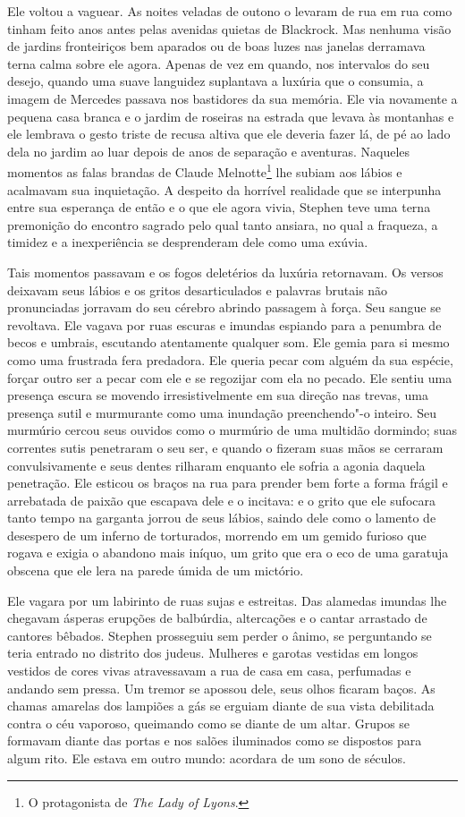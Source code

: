 Ele voltou a vaguear. As noites veladas de outono o levaram de rua em
rua como tinham feito anos antes pelas avenidas quietas de Blackrock.
Mas nenhuma visão de jardins fronteiriços bem aparados ou de boas luzes
nas janelas derramava terna calma sobre ele agora. Apenas de vez em
quando, nos intervalos do seu desejo, quando uma suave languidez
suplantava a luxúria que o consumia, a imagem de Mercedes passava nos
bastidores da sua memória. Ele via novamente a pequena casa branca e o
jardim de roseiras na estrada que levava às montanhas e ele lembrava o
gesto triste de recusa altiva que ele deveria fazer lá, de pé ao lado
dela no jardim ao luar depois de anos de separação e aventuras.
Naqueles momentos as falas brandas de Claude Melnotte\footnote{ O
protagonista de \textit{The Lady of Lyons}.} lhe subiam aos lábios e acalmavam sua inquietação. A
despeito da horrível realidade que se interpunha entre sua esperança de
então e o que ele agora vivia, Stephen teve uma terna premonição do
encontro sagrado pelo qual tanto ansiara, no qual a fraqueza, a timidez
e a inexperiência se desprenderam dele como uma exúvia.

Tais momentos passavam e os fogos deletérios da luxúria retornavam. Os
versos deixavam seus lábios e os gritos desarticulados e palavras
brutais não pronunciadas jorravam do seu cérebro abrindo passagem à
força. Seu sangue se revoltava. Ele vagava por ruas escuras e imundas
espiando para a penumbra de becos e umbrais, escutando atentamente
qualquer som. Ele gemia para si mesmo como uma frustrada fera
predadora. Ele queria pecar com alguém da sua espécie, forçar outro ser
a pecar com ele e se regozijar com ela no pecado. Ele sentiu uma
presença escura se movendo irresistivelmente em sua direção nas trevas,
uma presença sutil e murmurante como uma inundação preenchendo"-o
inteiro. Seu murmúrio cercou seus ouvidos como o murmúrio de uma
multidão dormindo; suas correntes sutis penetraram o seu ser, e quando
o fizeram suas mãos se cerraram convulsivamente e seus dentes rilharam
enquanto ele sofria a agonia daquela penetração. Ele esticou os braços
na rua para prender bem forte a forma frágil e arrebatada de paixão
que escapava dele e o incitava: e o grito que ele sufocara tanto tempo
na garganta jorrou de seus lábios, saindo dele como o lamento de
desespero de um inferno de torturados, morrendo em um gemido furioso
que rogava e exigia o abandono mais iníquo, um grito que era o eco de
uma garatuja obscena que ele lera na parede úmida de um mictório.

Ele vagara por um labirinto de ruas sujas e estreitas. Das alamedas
imundas lhe chegavam ásperas erupções de balbúrdia, altercações e o
cantar arrastado de cantores bêbados. Stephen prosseguiu sem perder o
ânimo, se perguntando se teria entrado no distrito dos judeus. Mulheres
e garotas vestidas em longos vestidos de cores vivas atravessavam a rua
de casa em casa, perfumadas e andando sem pressa. Um tremor se apossou
dele, seus olhos ficaram baços. As chamas amarelas dos lampiões a gás
se erguiam diante de sua vista debilitada contra o céu vaporoso,
queimando como se diante de um altar. Grupos se formavam diante das
portas e nos salões iluminados como se dispostos para algum rito. Ele
estava em outro mundo: acordara de um sono de séculos.


